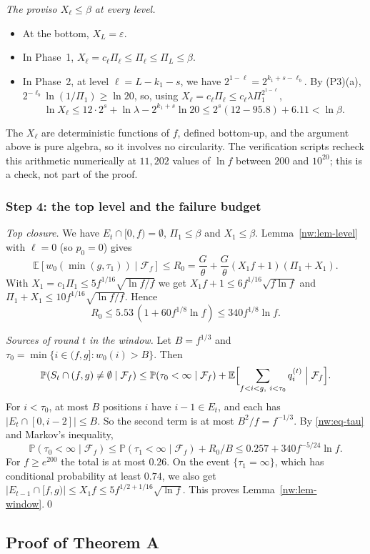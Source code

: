 \documentclass[11pt]{amsart}
\theoremstyle{definition}
\theoremstyle{remark}
\newcommand{\eps}{\varepsilon}
\newcommand{\PP}{\mathbb{P}}
\newcommand{\EE}{\mathbb{E}}
\newcommand{\cF}{\mathcal{F}}
\begin{document}
\emph{The proviso $X_\ell\le\beta$ at every level.}
\begin{itemize}[leftmargin=*]
\item At the bottom, $X_L=\eps$.
\item In Phase~1, $X_\ell=c_\ell\Pi_\ell\le\Pi_\ell\le\Pi_L\le\beta$.
\item In Phase~2, at level $\ell=L-k_1-s$, we have
  $2^{1-\ell}=2^{k_1+s-\ell_b}$. By (P3)(a),
  $2^{-\ell_b}\ln(1/\Pi_1)\ge\ln20$, so, using
  $X_\ell=c_\ell\Pi_\ell\le c_\ell\lambda\Pi_1^{2^{1-\ell}}$,
  \[
    \ln X_\ell\le12\cdot2^s+\ln\lambda-2^{k_1+s}\ln20
    \le2^s(12-95.8)+6.11<\ln\beta.
  \]
\end{itemize}
The $X_\ell$ are deterministic functions of $f$, defined bottom-up, and the
argument above is pure algebra, so it involves no circularity. The
verification scripts recheck this arithmetic numerically at $11{,}202$ values
of $\ln f$ between $200$ and $10^{20}$; this is a check, not part of the
proof.

\subsubsection{Step 4: the top level and the failure budget}
\emph{Top closure.} We have $E_t\cap[0,f)=\emptyset$, $\Pi_1\le\beta$ and
$X_1\le\beta$. Lemma~\ref{nw:lem-level} with $\ell=0$ (so $p_0=0$) gives
\[
  \EE[w_0(\min(g,\tau_1))\mid\cF_f]\le R_0
  =\frac G\theta+\frac G\theta(X_1f+1)(\Pi_1+X_1).
\]
With $X_1=c_1\Pi_1\le5f^{1/16}\sqrt{\ln f/f}$ we get
$X_1f+1\le6f^{1/16}\sqrt{f\ln f}$ and
$\Pi_1+X_1\le10f^{1/16}\sqrt{\ln f/f}$. Hence
\[
  R_0\le5.53\,(1+60f^{1/8}\ln f)\le340f^{1/8}\ln f.
\]

\emph{Sources of round $t$ in the window.} Let $B=f^{1/3}$ and
$\tau_0=\min\{i\in(f,g]:w_0(i)>B\}$. Then
\[
  \PP(S_t\cap(f,g)\ne\emptyset\mid\cF_f)\le\PP(\tau_0<\infty\mid\cF_f)
  +\EE\Bigl[\sum_{f<i<g,\ i<\tau_0}q^{(t)}_i\Bigm|\cF_f\Bigr].
\]
For $i<\tau_0$, at most $B$ positions $i$ have $i-1\in E_t$, and each has
$|E_t\cap[0,i-2]|\le B$. So the second term is at most $B^2/f=f^{-1/3}$. By
\eqref{nw:eq-tau} and Markov's inequality,
\[
  \PP(\tau_0<\infty\mid\cF_f)\le\PP(\tau_1<\infty\mid\cF_f)+R_0/B
  \le0.257+340f^{-5/24}\ln f.
\]
For $f\ge e^{200}$ the total is at most $0.26$. On the event
$\{\tau_1=\infty\}$, which has conditional probability at least $0.74$, we
also get $|E_{t-1}\cap[f,g)|\le X_1f\le5f^{1/2+1/16}\sqrt{\ln f}$. This
proves Lemma~\ref{nw:lem-window}.\qed

\subsection{Proof of Theorem A}\label{nw:sec-main}
\end{document}
